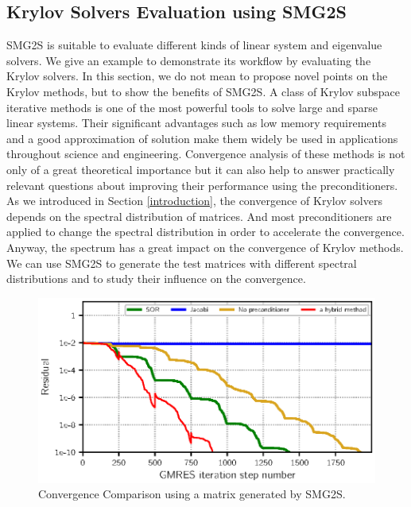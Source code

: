 \subsection{Krylov Solvers Evaluation using SMG2S}\label{application}

SMG2S is suitable to evaluate different kinds of linear system and eigenvalue solvers. We give an example to demonstrate its workflow by evaluating the Krylov solvers. In this section, we do not mean to propose novel points on the Krylov methods, but to show the benefits of SMG2S. A class of Krylov subspace iterative methods is one of the most powerful tools to solve large and sparse linear systems. Their significant advantages such as low memory requirements and a good approximation of solution make them widely be used in applications throughout science and engineering. Convergence analysis of these methods is not only of a great theoretical importance but it can also help to answer practically relevant questions about improving their performance using the preconditioners. As we introduced in Section \ref{introduction}, the convergence of Krylov solvers depends on the spectral distribution of matrices. And most preconditioners are applied to change the spectral distribution in order to accelerate the convergence. Anyway, the spectrum has a great impact on the convergence of Krylov methods. We can use SMG2S to generate the test matrices with different spectral distributions and to study their influence on the convergence.

\begin{figure}[htbp]
	\label{fig:smg2s-convergence}
	\caption{Convergence Comparison using a matrix generated by SMG2S.}
	\centering
	\includegraphics[width=6.2in]{fig/smg2s_convergence.eps}
\end{figure}

